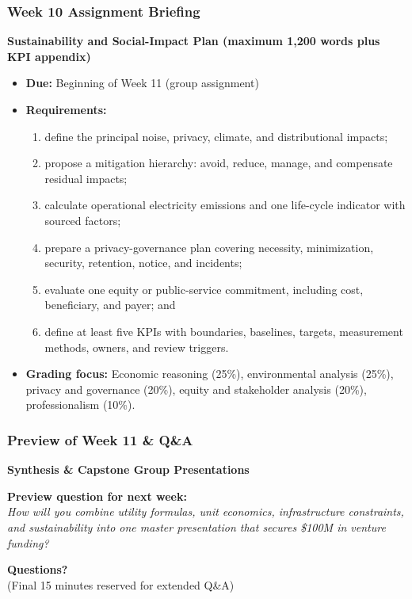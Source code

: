 \documentclass{beamer}
\begin{document}
\begin{frame}[t]
\frametitle{Week 10 Assignment Briefing}
\textbf{Sustainability and Social-Impact Plan (maximum 1,200 words plus KPI appendix)}
\begin{itemize}
\item \textbf{Due:} Beginning of Week 11 (group assignment)
\item \textbf{Requirements:}
\begin{enumerate}
\item define the principal noise, privacy, climate, and distributional impacts;
\item propose a mitigation hierarchy: avoid, reduce, manage, and compensate residual impacts;
\item calculate operational electricity emissions and one life-cycle indicator with sourced factors;
\item prepare a privacy-governance plan covering necessity, minimization, security, retention, notice, and incidents;
\item evaluate one equity or public-service commitment, including cost, beneficiary, and payer; and
\item define at least five KPIs with boundaries, baselines, targets, measurement methods, owners, and review triggers.
\end{enumerate}
\item \textbf{Grading focus:} Economic reasoning (25\%), environmental analysis (25\%), privacy and governance (20\%), equity and stakeholder analysis (20\%), professionalism (10\%).
\end{itemize}
\end{frame}

\begin{frame}[t]
  \frametitle{Preview of Week 11 \& Q\&A}
  
  \begin{center}
      \Large \textbf{Synthesis \& Capstone Group Presentations}
  \end{center}
  
  \vspace{0.5cm}
  \textbf{Preview question for next week:} \\
  \textit{How will you combine utility formulas, unit economics, infrastructure constraints, and sustainability into one master presentation that secures \$100M in venture funding?}
  
  \vspace{0.5cm}
  \begin{center}
      \textbf{Questions?} \\
      \small (Final 15 minutes reserved for extended Q\&A)
  \end{center}
\end{frame}
\end{document}

